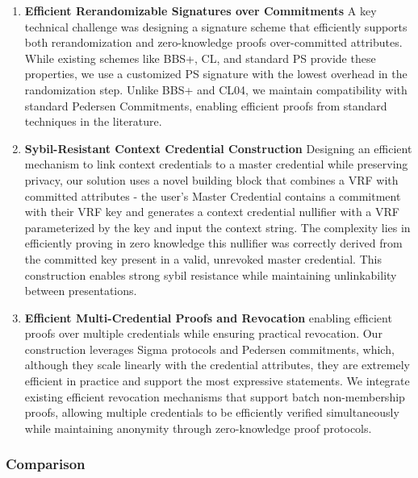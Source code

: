 \begin{enumerate}

    \item \textbf{Efficient Rerandomizable Signatures over Commitments} A key technical challenge was designing a signature scheme that efficiently supports both rerandomization and zero-knowledge proofs over-committed attributes. While existing schemes like BBS+, CL, and standard PS provide these properties, we use a customized PS signature with the lowest overhead in the randomization step. %
    Unlike BBS+ and CL04, we maintain compatibility with standard Pedersen Commitments, enabling efficient proofs from standard techniques in the literature.
    

    \item \textbf{Sybil-Resistant Context Credential Construction} Designing an efficient mechanism to link context credentials to a master credential while preserving privacy, our solution uses a novel building block that combines a VRF with committed attributes - the user's Master Credential contains a commitment with their VRF key and generates a context credential nullifier with a VRF parameterized by the key and input the context string. 
    The complexity lies in efficiently proving in zero knowledge this nullifier was correctly derived from the committed key present in a valid, unrevoked master credential. This construction enables strong sybil resistance while maintaining unlinkability between presentations.

    \item \textbf{Efficient Multi-Credential Proofs and Revocation} enabling efficient proofs over multiple credentials while ensuring practical revocation. Our construction leverages Sigma protocols and Pedersen commitments, which, although they scale linearly with the credential attributes, they are extremely efficient in practice and support the most expressive statements. We integrate existing efficient revocation mechanisms that support batch non-membership proofs, allowing multiple credentials to be efficiently verified simultaneously while maintaining anonymity through zero-knowledge proof protocols. 

\end{enumerate}


\subsubsection{Comparison}


